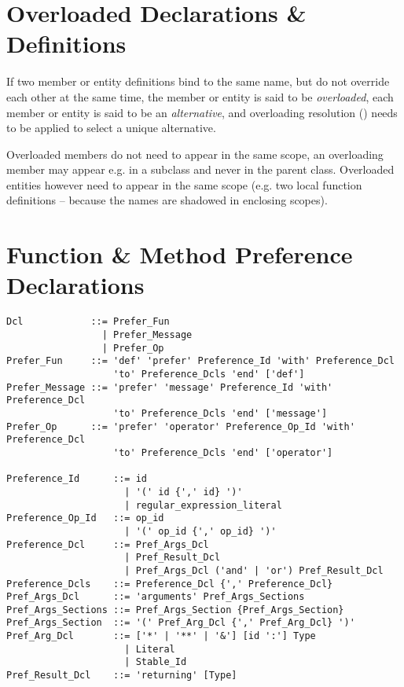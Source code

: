 \section{Overloaded Declarations \& Definitions}
\label{sec:overloaded-definitions}

If two member or entity definitions bind to the same name, but do not override each other at the same time, the member or entity is said to be {\em overloaded}, each member or entity is said to be an {\em alternative}, and overloading resolution () needs to be applied to select a unique alternative. 

Overloaded members do not need to appear in the same scope, an overloading member may appear e.g. in a subclass and never in the parent class. Overloaded entities however need to appear in the same scope (e.g. two local function definitions -- because the names are shadowed in enclosing scopes). 





\section{Function \& Method Preference Declarations}
\label{sec:func-method-preference-decl}

\syntax\begin{lstlisting}
Dcl            ::= Prefer_Fun
                 | Prefer_Message
                 | Prefer_Op
Prefer_Fun     ::= 'def' 'prefer' Preference_Id 'with' Preference_Dcl 
                   'to' Preference_Dcls 'end' ['def']
Prefer_Message ::= 'prefer' 'message' Preference_Id 'with' Preference_Dcl 
                   'to' Preference_Dcls 'end' ['message']
Prefer_Op      ::= 'prefer' 'operator' Preference_Op_Id 'with' Preference_Dcl 
                   'to' Preference_Dcls 'end' ['operator']

Preference_Id      ::= id 
                     | '(' id {',' id} ')' 
                     | regular_expression_literal
Preference_Op_Id   ::= op_id 
                     | '(' op_id {',' op_id} ')'
Preference_Dcl     ::= Pref_Args_Dcl 
                     | Pref_Result_Dcl 
                     | Pref_Args_Dcl ('and' | 'or') Pref_Result_Dcl
Preference_Dcls    ::= Preference_Dcl {',' Preference_Dcl}
Pref_Args_Dcl      ::= 'arguments' Pref_Args_Sections
Pref_Args_Sections ::= Pref_Args_Section {Pref_Args_Section}
Pref_Args_Section  ::= '(' Pref_Arg_Dcl {',' Pref_Arg_Dcl} ')'
Pref_Arg_Dcl       ::= ['*' | '**' | '&'] [id ':'] Type
                     | Literal
                     | Stable_Id
Pref_Result_Dcl    ::= 'returning' [Type]
\end{lstlisting}

